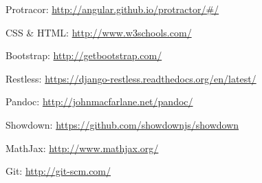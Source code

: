 \documentclass[letterpaper,10pt,oneside]{sphinxmanual}
\begin{document}
Protracor: \href{http://angular.github.io/protractor/\#/}{http://angular.github.io/protractor/\#/}

CSS \& HTML: \href{http://www.w3schools.com/}{http://www.w3schools.com/}

Bootstrap: \href{http://getbootstrap.com/}{http://getbootstrap.com/}

Restless: \href{https://django-restless.readthedocs.org/en/latest/}{https://django-restless.readthedocs.org/en/latest/}

Pandoc: \href{http://johnmacfarlane.net/pandoc/}{http://johnmacfarlane.net/pandoc/}

Showdown: \href{https://github.com/showdownjs/showdown}{https://github.com/showdownjs/showdown}

MathJax: \href{http://www.mathjax.org/}{http://www.mathjax.org/}

Git: \href{http://git-scm.com/}{http://git-scm.com/}



\renewcommand{\indexname}{Index}
\printindex
\end{document}
